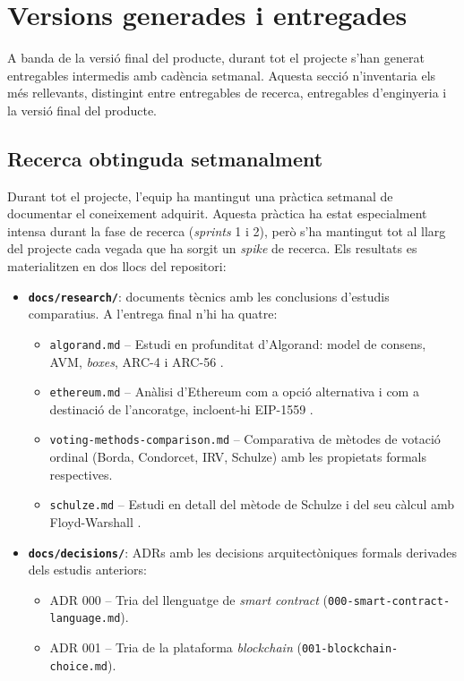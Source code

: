 \section{Versions generades i entregades}
\label{sec:versions}

A banda de la versió final del producte, durant tot el projecte s'han
generat entregables intermedis amb cadència setmanal. Aquesta secció
n'inventaria els més rellevants, distingint entre entregables de
recerca, entregables d'enginyeria i la versió final del producte.

\subsection{Recerca obtinguda setmanalment}
\label{sec:recerca-setmanal}

Durant tot el projecte, l'equip ha mantingut una pràctica setmanal de
documentar el coneixement adquirit. Aquesta pràctica ha estat
especialment intensa durant la fase de recerca (\emph{sprints} 1 i 2),
però s'ha mantingut tot al llarg del projecte cada vegada que ha
sorgit un \emph{spike} de recerca. Els resultats es materialitzen en
dos llocs del repositori:

\begin{itemize}
    \item \textbf{\texttt{docs/research/}}: documents tècnics amb les
    conclusions d'estudis comparatius. A l'entrega final n'hi ha
    quatre:
    \begin{itemize}
        \item \texttt{algorand.md} -- Estudi en profunditat
        d'Algorand: model de consens, \ac{AVM}, \emph{boxes}, ARC-4
        \cite{algorandfoundation2023arc4} i ARC-56
        \cite{algorandfoundation2023arc56}.
        \item \texttt{ethereum.md} -- Anàlisi d'Ethereum com a opció
        alternativa i com a destinació de l'ancoratge, incloent-hi
        \ac{EIP}-1559 \cite{eip1559}.
        \item \texttt{voting-methods-comparison.md} -- Comparativa de
        mètodes de votació ordinal (Borda, Condorcet, IRV, Schulze)
        amb les propietats formals respectives.
        \item \texttt{schulze.md} -- Estudi en detall del mètode de
        Schulze \cite{schulze2011newmethod} i del seu càlcul amb
        Floyd-Warshall \cite{floyd1962algorithm}.
    \end{itemize}

    \item \textbf{\texttt{docs/decisions/}}: \aclp{ADR} amb les
    decisions arquitectòniques formals derivades dels estudis
    anteriors:
    \begin{itemize}
        \item \ac{ADR} 000 -- Tria del llenguatge de \emph{smart
        contract} (\texttt{000-smart-contract-language.md}).
        \item \ac{ADR} 001 -- Tria de la plataforma \emph{blockchain}
        (\texttt{001-blockchain-choice.md}).
    \end{itemize}
\end{itemize}

